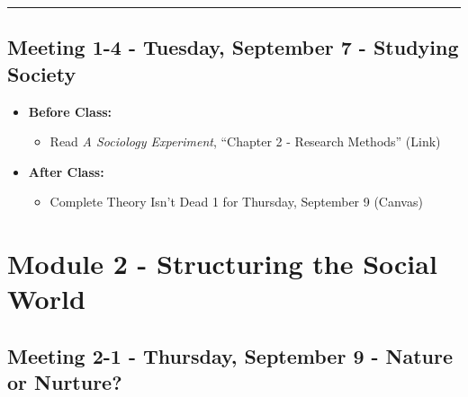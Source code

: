 \documentclass[
]{book}
\providecommand{\tightlist}{%
  \setlength{\itemsep}{0pt}\setlength{\parskip}{0pt}}
\begin{document}
\begin{center}\rule{0.5\linewidth}{0.5pt}\end{center}

\hypertarget{meeting-1-4---tuesday-september-7---studying-society}{%
\subsection*{Meeting 1-4 - Tuesday, September 7 - Studying Society}\label{meeting-1-4---tuesday-september-7---studying-society}}

\begin{itemize}
\tightlist
\item
  \textbf{Before Class:}

  \begin{itemize}
  \tightlist
  \item
    Read \emph{A Sociology Experiment}, ``Chapter 2 - Research Methods'' (Link)
  \end{itemize}
\item
  \textbf{After Class:}

  \begin{itemize}
  \tightlist
  \item
    Complete Theory Isn't Dead 1 for Thursday, September 9 (Canvas)
  \end{itemize}
\end{itemize}

\newpage

\hypertarget{module-2---structuring-the-social-world}{%
\section{Module 2 - Structuring the Social World}\label{module-2---structuring-the-social-world}}

\hypertarget{meeting-2-1---thursday-september-9---nature-or-nurture}{%
\subsection*{Meeting 2-1 - Thursday, September 9 - Nature or Nurture?}\label{meeting-2-1---thursday-september-9---nature-or-nurture}}
\end{document}
